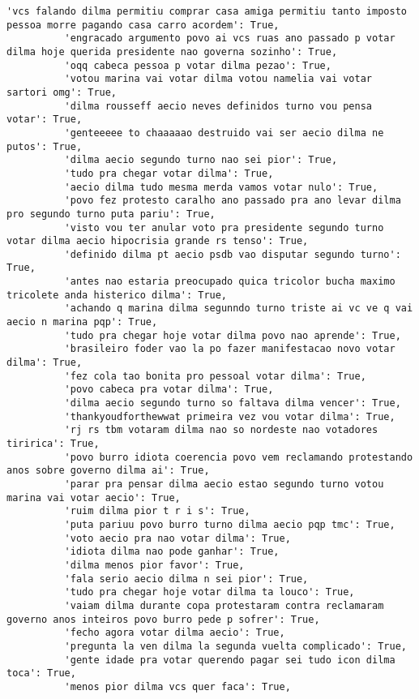 \documentclass[11pt]{article}
\begin{document}
\begin{Verbatim}[commandchars=\\\{\}]
          'vcs falando dilma permitiu comprar casa amiga permitiu tanto imposto pessoa morre pagando casa carro acordem': True,
          'engracado argumento povo ai vcs ruas ano passado p votar dilma hoje querida presidente nao governa sozinho': True,
          'oqq cabeca pessoa p votar dilma pezao': True,
          'votou marina vai votar dilma votou namelia vai votar sartori omg': True,
          'dilma rousseff aecio neves definidos turno vou pensa votar': True,
          'genteeeee to chaaaaao destruido vai ser aecio dilma ne putos': True,
          'dilma aecio segundo turno nao sei pior': True,
          'tudo pra chegar votar dilma': True,
          'aecio dilma tudo mesma merda vamos votar nulo': True,
          'povo fez protesto caralho ano passado pra ano levar dilma pro segundo turno puta pariu': True,
          'visto vou ter anular voto pra presidente segundo turno votar dilma aecio hipocrisia grande rs tenso': True,
          'definido dilma pt aecio psdb vao disputar segundo turno': True,
          'antes nao estaria preocupado quica tricolor bucha maximo tricolete anda histerico dilma': True,
          'achando q marina dilma segunndo turno triste ai vc ve q vai aecio n marina pqp': True,
          'tudo pra chegar hoje votar dilma povo nao aprende': True,
          'brasileiro foder vao la po fazer manifestacao novo votar dilma': True,
          'fez cola tao bonita pro pessoal votar dilma': True,
          'povo cabeca pra votar dilma': True,
          'dilma aecio segundo turno so faltava dilma vencer': True,
          'thankyoudforthewwat primeira vez vou votar dilma': True,
          'rj rs tbm votaram dilma nao so nordeste nao votadores tiririca': True,
          'povo burro idiota coerencia povo vem reclamando protestando anos sobre governo dilma ai': True,
          'parar pra pensar dilma aecio estao segundo turno votou marina vai votar aecio': True,
          'ruim dilma pior t r i s': True,
          'puta pariuu povo burro turno dilma aecio pqp tmc': True,
          'voto aecio pra nao votar dilma': True,
          'idiota dilma nao pode ganhar': True,
          'dilma menos pior favor': True,
          'fala serio aecio dilma n sei pior': True,
          'tudo pra chegar hoje votar dilma ta louco': True,
          'vaiam dilma durante copa protestaram contra reclamaram governo anos inteiros povo burro pede p sofrer': True,
          'fecho agora votar dilma aecio': True,
          'pregunta la ven dilma la segunda vuelta complicado': True,
          'gente idade pra votar querendo pagar sei tudo icon dilma toca': True,
          'menos pior dilma vcs quer faca': True,

\end{Verbatim}
\end{document}
